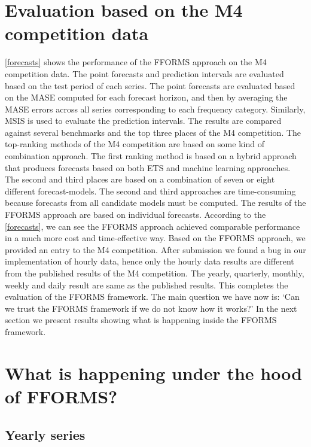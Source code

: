 \documentclass[11pt,a4paper,]{article}
\begin{document}
\hypertarget{results1}{%
\section{Evaluation based on the M4 competition data}\label{results1}}

\autoref{forecasts} shows the performance of the FFORMS approach on the M4 competition data. The point forecasts and prediction intervals are evaluated based on the test period of each series. The point forecasts are evaluated based on the MASE computed for each forecast horizon, and then by averaging the MASE errors across all series corresponding to each frequency category. Similarly, MSIS is used to evaluate the prediction intervals. The results are compared against several benchmarks and the top three places of the M4 competition. The top-ranking methods of the M4 competition are based on some kind of combination approach. The first ranking method is based on a hybrid approach that produces forecasts based on both ETS and machine learning approaches. The second and third places are based on a combination of seven or eight different forecast-models. The second and third approaches are time-consuming because forecasts from all candidate models must be computed. The results of the FFORMS approach are based on individual forecasts. According to the \autoref{forecasts}, we can see the FFORMS approach achieved comparable performance in a much more cost and time-effective way. Based on the FFORMS approach, we provided an entry to the M4 competition. After submission we found a bug in our implementation of hourly data, hence only the hourly data results are different from the published results of the M4 competition. The yearly, quarterly, monthly, weekly and daily result are same as the published results. This completes the evaluation of the FFORMS framework. The main question we have now is: `Can we trust the FFORMS framework if we do not know how it works?' In the next section we present results showing what is happening inside the FFORMS framework.

\hypertarget{results2}{%
\section{What is happening under the hood of FFORMS?}\label{results2}}

\hypertarget{yearly-series}{%
\subsection{Yearly series}\label{yearly-series}}
\end{document}
